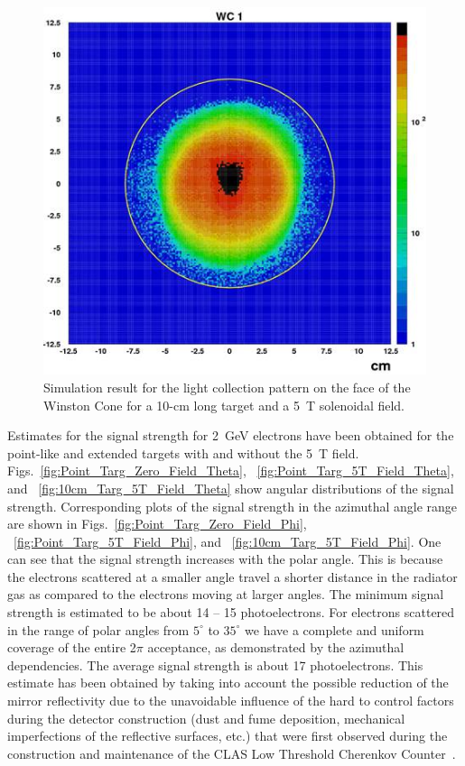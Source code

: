 \begin{figure}[!ht]
    \centering
    \includegraphics[width=1.0\linewidth,trim={0.0cm 0.0cm 0.0cm 0.0cm},clip]{images/10cm_Targ_5T_Field_WCone.jpg}
    \caption{Simulation result for the light collection pattern on the face of the Winston Cone for a 10-cm long target
      and a 5~T solenoidal field.}
    \label{fig:10cm_Targ_5T_Field_WCone}
\end{figure}

Estimates for the signal strength for 2~GeV electrons have been obtained for the point-like and extended targets
with and without the 5~T field. Figs.~\ref{fig:Point_Targ_Zero_Field_Theta}, 
~\ref{fig:Point_Targ_5T_Field_Theta}, and ~\ref{fig:10cm_Targ_5T_Field_Theta} show angular distributions of
the signal strength. Corresponding plots of the signal strength in the azimuthal angle range are shown in
Figs.~\ref{fig:Point_Targ_Zero_Field_Phi}, ~\ref{fig:Point_Targ_5T_Field_Phi}, and 
~\ref{fig:10cm_Targ_5T_Field_Phi}. One can see that the signal strength increases with the polar angle. This
is because the electrons scattered at a smaller angle travel a shorter distance in the radiator gas as compared to
the electrons moving at larger angles. The minimum signal strength is estimated to be about 14 – 15 photoelectrons.
For electrons scattered in the range of polar angles from $5^\circ$ to $35^\circ$ we have a complete and uniform
coverage of the entire 2$\pi$ acceptance, as demonstrated by the azimuthal dependencies. The average signal
strength is about 17 photoelectrons. This estimate has been obtained by taking into account the possible reduction of
the mirror reflectivity due to the unavoidable influence of the hard to control factors during the detector construction
(dust and fume deposition, mechanical imperfections of the reflective surfaces, etc.) that were first observed during
the construction and maintenance of the CLAS Low Threshold Cherenkov Counter~\cite{Adams:2001kk}.

